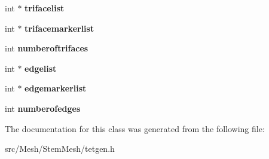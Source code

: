 \begin{DoxyCompactItemize}
int $\ast$ {\bfseries trifacelist}
\item 
\mbox{\label{classStemMesh3D_1_1tetgenio_a5e7a5d11d168251f7d5ba8794f13fe42}} 
int $\ast$ {\bfseries trifacemarkerlist}
\item 
\mbox{\label{classStemMesh3D_1_1tetgenio_a5555ba8f8337eb339d0fe2d7decd3475}} 
int {\bfseries numberoftrifaces}
\item 
\mbox{\label{classStemMesh3D_1_1tetgenio_af075e154234bb4975355f6a6ade72b0a}} 
int $\ast$ {\bfseries edgelist}
\item 
\mbox{\label{classStemMesh3D_1_1tetgenio_accedc23de3f2aa2a567a9ee7560819d5}} 
int $\ast$ {\bfseries edgemarkerlist}
\item 
\mbox{\label{classStemMesh3D_1_1tetgenio_a12a7d8064cd6a20c386d69d65ba37ffd}} 
int {\bfseries numberofedges}
\end{DoxyCompactItemize}


The documentation for this class was generated from the following file\+:\begin{DoxyCompactItemize}
\item 
src/\+Mesh/\+Stem\+Mesh/tetgen.\+h\end{DoxyCompactItemize}
